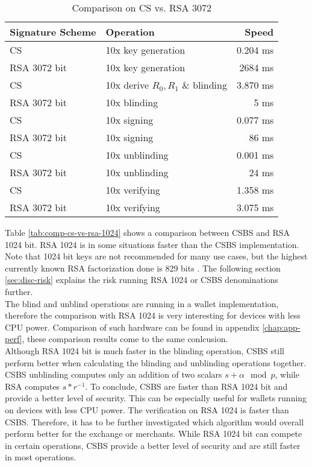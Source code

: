 \begin{table}[h]
    \centering
    \setupBfhTabular
    \begin{tabular}{llr}
        \rowcolor{BFH-tablehead}
        \textbf{Signature Scheme} & \textbf{Operation} & \textbf{Speed} \\\hline
        CS & 10x key generation & 0.204 ms \\\hline
        RSA 3072 bit & 10x key generation & 2684 ms \\\hline
        \hline
        CS & 10x derive $R_0, R_1$ \& blinding  & 3.870 ms \\\hline
        RSA 3072 bit & 10x blinding & 5 ms \\\hline
        \hline
        CS & 10x signing & 0.077 ms \\\hline
        RSA 3072 bit & 10x signing & 86 ms \\\hline
        \hline
        CS & 10x unblinding & 0.001 ms \\\hline
        RSA 3072 bit & 10x unblinding & 24 ms \\\hline
        \hline
        CS & 10x verifying & 1.358 ms \\\hline
        RSA 3072 bit & 10x verifying & 3.075 ms \\\hline
    \end{tabular}
    \caption{Comparison on CS vs. RSA 3072}
    \label{tab:comp-cs-vs-rsa-3072}
\end{table}

Table \ref{tab:comp-cs-vs-rsa-1024} shows a comparison between \gls{CSBS} and RSA 1024 bit.
RSA 1024 is in some situations faster than the \gls{CSBS} implementation.
Note that 1024 bit keys are not recommended for many use cases, but the highest currently known RSA factorization done is 829 bits \cite{enwiki:1055393696}.
The following section \ref{sec:disc-risk} explains the risk running RSA 1024 or \gls{CSBS} denominations further.\\
The blind and unblind operations are running in a wallet implementation, therefore the comparison with RSA 1024 is very interesting for devices with less CPU power.
Comparison of such hardware can be found in appendix \ref{chap:app-perf}, these comparison results come to the same conlcusion.\\
Although RSA 1024 bit is much faster in the blinding operation, \gls{CSBS} still perform better when calculating the blinding and unblinding operations together.
\gls{CSBS} unblinding computes only an addition of two scalars $s + \alpha \mod p$, while RSA computes $s * r^{-1}$.
To conclude, \gls{CSBS} are faster than RSA 1024 bit and provide a better level of security.
This can be especially useful for wallets running on devices with less CPU power.
The verification on RSA 1024 is faster than \gls{CSBS}.
Therefore, it has to be further investigated which algorithm would overall perform better for the exchange or merchants.
While RSA 1024 bit can compete in certain operations, \gls{CSBS} provide a better level of security and are still faster in most operations.

